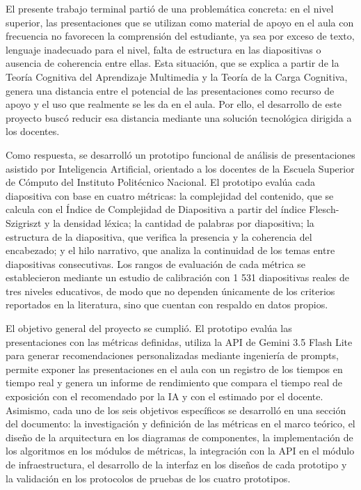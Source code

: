 \documentclass[11pt]{article}
\begin{document}
El presente trabajo terminal partió de una problemática concreta: en el nivel superior, las presentaciones que se utilizan como material de apoyo en el aula con frecuencia no favorecen la comprensión del estudiante, ya sea por exceso de texto, lenguaje inadecuado para el nivel, falta de estructura en las diapositivas o ausencia de coherencia entre ellas. Esta situación, que se explica a partir de la Teoría Cognitiva del Aprendizaje Multimedia y la Teoría de la Carga Cognitiva, genera una distancia entre el potencial de las presentaciones como recurso de apoyo y el uso que realmente se les da en el aula. Por ello, el desarrollo de este proyecto buscó reducir esa distancia mediante una solución tecnológica dirigida a los docentes.

Como respuesta, se desarrolló un prototipo funcional de análisis de presentaciones asistido por Inteligencia Artificial, orientado a los docentes de la Escuela Superior de Cómputo del Instituto Politécnico Nacional. El prototipo evalúa cada diapositiva con base en cuatro métricas: la complejidad del contenido, que se calcula con el Índice de Complejidad de Diapositiva a partir del índice Flesch-Szigriszt y la densidad léxica; la cantidad de palabras por diapositiva; la estructura de la diapositiva, que verifica la presencia y la coherencia del encabezado; y el hilo narrativo, que analiza la continuidad de los temas entre diapositivas consecutivas. Los rangos de evaluación de cada métrica se establecieron mediante un estudio de calibración con 1 531 diapositivas reales de tres niveles educativos, de modo que no dependen únicamente de los criterios reportados en la literatura, sino que cuentan con respaldo en datos propios.

El objetivo general del proyecto se cumplió. El prototipo evalúa las presentaciones con las métricas definidas, utiliza la API de Gemini 3.5 Flash Lite para generar recomendaciones personalizadas mediante ingeniería de prompts, permite exponer las presentaciones en el aula con un registro de los tiempos en tiempo real y genera un informe de rendimiento que compara el tiempo real de exposición con el recomendado por la IA y con el estimado por el docente. Asimismo, cada uno de los seis objetivos específicos se desarrolló en una sección del documento: la investigación y definición de las métricas en el marco teórico, el diseño de la arquitectura en los diagramas de componentes, la implementación de los algoritmos en los módulos de métricas, la integración con la API en el módulo de infraestructura, el desarrollo de la interfaz en los diseños de cada prototipo y la validación en los protocolos de pruebas de los cuatro prototipos.
\end{document}
